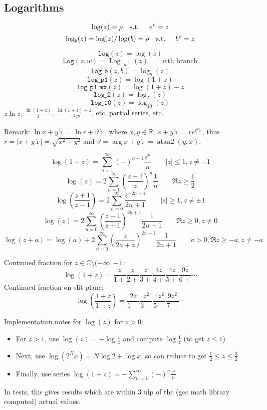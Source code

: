 \documentclass[10pt,dvipdfmx,letterpaper,twoside]{article}
\newcommand{\F}[1]{{\mathtt{#1}}}
\let\O=\operatorname
\newcommand{\RR}{{\mathbb{R}}}
\newcommand{\CC}{{\mathbb{C}}}
\newcommand{\ii}{{\hat{\imath}}}
\newenvironment{implementation}{\noindent\begin{framed}}{\end{framed}}
\let\theta=\vartheta
\begin{document}
\subsection{Logarithms}

\[ \log(z) = \rho \text{\quad s.t. \quad} e^\rho = z \]
\[ \log_b(z) = \log(z)/\log(b) = \rho \text{\quad s.t. \quad} b^\rho = z \]

\[ \F{log}(z) = \log(z) \]
\[ \F{Log}(z,w) = \O{Log}_{[w]}(z) \qquad\text{$w$th branch}\]
\[ \F{log\_b}(z, b) = \log_{b}(z) \]
\[ \F{log\_p1}(z) = \log(1+z) \]
\[ \F{log\_p1\_mx}(z) = \log(1+z)-z \]
\[ \F{log\_2}(z) = \log_{2}(z) \]
\[ \F{log\_10}(z) = \log_{10}(z) \]
$z\ln z$, $\frac{\ln(1+z)}{z}$, $\frac{\ln(1+z)-z}{-z^2/2}$, etc.
partial series, etc.

Remark: $\ln x+y\ii = \ln r + \theta\ii$, where $x,y\in\RR$, $x+y\ii=r e^{\theta\ii}$, thus
$r=|x+y\ii|=\sqrt{x^2+y^2}$ and $\theta=\arg x+y\ii = \O{atan2}(y,x)$.

\[ \log(1+z) = \sum_{n=1}^\infty (-)^{n-1} \frac{z^n}{n} \qquad |z|\leq1, z\neq-1 \]
\[ \log(z) = 2\sum_{n=1}^\infty\left(\frac{z-1}{z}\right)^n\frac{1}{n} \qquad \Re z\geq\frac12 \]
\[ \log(\frac{z+1}{z-1}) = 2\sum_{n=0}^\infty\frac{z^{-2n-1}}{2n+1} \qquad |z|\geq1, z\neq\pm1 \]
\[ \log(z) = 2\sum_{n=0}^\infty\left(\frac{z-1}{z+1}\right)^{2n+1} \frac{1}{2n+1} \qquad \Re z\geq0, z\neq0 \]
\[ \log(z+a) = \log(a) + 2\sum_{n=0}^\infty \left(\frac{z}{2a+z}\right)^{2n+1} \frac{1}{2n+1} \qquad a>0, \Re z\geq-a, z\neq-a \]

Continued fraction for $z\in\CC\setminus(-\infty,-1]$:
\[ \log(1+z) = \frac{z}{1+} \frac{z}{2+} \frac{z}{3+} \frac{4z}{4+} \frac{4z}{5+} \frac{9z}{6+} \cdots \]
Continued fraction on slit-plane:
\[ \log(\frac{1+z}{1-z}) = \frac{2z}{1-} \frac{z^2}{3-} \frac{4z^2}{5-} \frac{9z^2}{7-} \cdots \]

\begin{implementation}
Implementation notes for $\log(z)$ for $z>0$:
\begin{itemize}
\item For $z>1$, use $\log(z) = -\log\frac1z$ and compute $\log\frac1z$ (to get $z\leq1$)
\item Next, use $\log(2^N x) = N\log 2 + \log x$, so can reduce to get $\tfrac12\leq z\leq\tfrac32$
\item Finally, use series $\log(1+z) = -\sum_{n=1}^\infty(-)^n\frac{z^n}{n}$
\end{itemize}
In tests, this gives results which are within 3 ulp of the (gcc math library computed) actual values.
\end{implementation}
\end{document}
